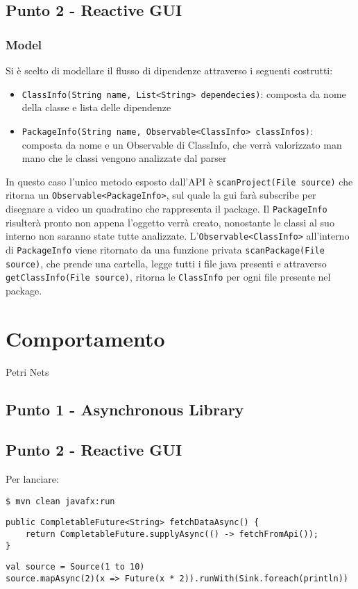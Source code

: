 \documentclass[a4paper,12pt]{report}
\begin{document}
    \section{Punto 2 - Reactive GUI}
    \subsection{Model}
    Si è scelto di modellare il flusso di dipendenze attraverso i seguenti costrutti:
    \begin{itemize}
        \item\texttt{ClassInfo(String name, List<String> dependecies)}: composta da nome della classe e lista delle dipendenze
        \item\texttt{PackageInfo(String name, Observable<ClassInfo> classInfos)}: composta da nome e un Observable di ClassInfo,
                    che verrà valorizzato man mano che le classi vengono analizzate dal parser
    \end{itemize}
    In questo caso l'unico metodo esposto dall'API è \texttt{scanProject(File source)} che ritorna un
    \texttt{Observable<PackageInfo>}, sul quale la gui farà subscribe per disegnare a video un quadratino
    che rappresenta il package. Il \texttt{PackageInfo} risulterà pronto non appena l'oggetto verrà creato,
    nonostante le classi al suo interno non saranno state tutte analizzate.
    L'\texttt{Observable<ClassInfo>} all'interno di \texttt{PackageInfo} viene ritornato da una funzione privata
    \texttt{scanPackage(File source)}, che prende una cartella, legge tutti i file java presenti e attraverso
    \texttt{getClassInfo(File source)}, ritorna le \texttt{ClassInfo} per ogni file presente nel package.


    \chapter{Comportamento}
    Petri Nets
    \section{Punto 1 - Asynchronous Library}
    \section{Punto 2 - Reactive GUI}
    Per lanciare:
    \begin{lstlisting}[style=bash, caption={Avvio dello script}]
$ mvn clean javafx:run
    \end{lstlisting}
    \begin{lstlisting}[style=java, caption={Metodo Java asincrono}]
public CompletableFuture<String> fetchDataAsync() {
    return CompletableFuture.supplyAsync(() -> fetchFromApi());
}
    \end{lstlisting}
    \begin{lstlisting}[style=scala, caption={Esempio reattivo in Scala}]
val source = Source(1 to 10)
source.mapAsync(2)(x => Future(x * 2)).runWith(Sink.foreach(println))
    \end{lstlisting}
\end{document}
